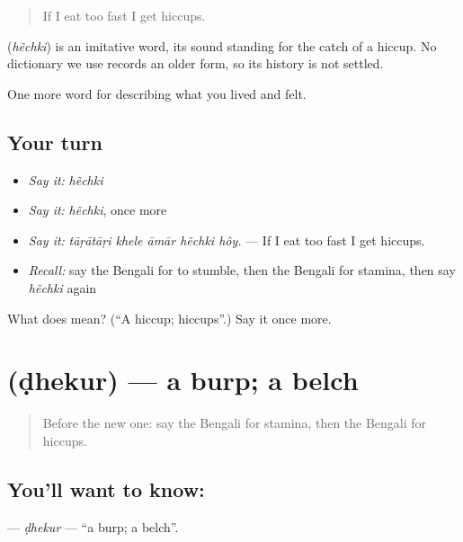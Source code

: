 \begin{quote}
If I eat too fast I get hiccups.
\end{quote}

\begin{cousinweb}
\textbf{} (\emph{hẽchki}) is an imitative word, its sound standing for the catch of a hiccup. No dictionary we use records an older form, so its history is not settled.
\end{cousinweb}

\begin{grammarlens}[title={What you've built}]
One more word for describing what you lived and felt.
\end{grammarlens}

\subsection*{Your turn}
\begin{itemize}
\raggedright
  \item \emph{Say it:} \emph{hẽchki}
  \item \emph{Say it:} \emph{hẽchki}, once more
  \item \emph{Say it:} \emph{tāṛātāṛi khele āmār hẽchki hôy.} — If I eat too fast I get hiccups.
  \item \emph{Recall:} say the Bengali for to stumble, then the Bengali for stamina, then say \emph{hẽchki} again
\end{itemize}

\begin{tcolorbox}[breakable,colback=teal!4,colframe=teal!35!black,title={Before you move on}]
What does  mean? (\textquotedblleft{}A hiccup; hiccups\textquotedblright{}.) Say it once more.
\end{tcolorbox}
\section[\texorpdfstring{\bn{ঢেকুর} (ḍhekur)}{ঢেকুর (ḍhekur)}]{ (ḍhekur) — a burp; a belch}

\label{lesson:BN-C476-dhekur}



\begin{quote}
Before the new one: say the Bengali for stamina, then the Bengali for hiccups.
\end{quote}

\subsection*{You'll want to know: }
\textbf{} — \emph{ḍhekur} — \textquotedblleft{}a burp; a belch\textquotedblright{}.

